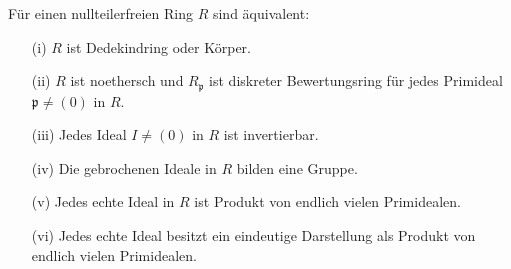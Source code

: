 \begin{Satz}\label{Satz13}
F\"ur einen nullteilerfreien Ring $R$ sind \"aquivalent:

\begin{enumerate}
\item[(i)] $R$ ist Dedekindring oder K\"orper.

\item[(ii)] $R$ ist noethersch und $R_\mathfrak{p}$ ist diskreter Bewertungsring f\"ur jedes Primideal $\mathfrak{p} \neq (0)$ in $R$.

\item[(iii)] Jedes Ideal $I \neq (0)$ in $R$ ist invertierbar.

\item[(iv)] Die gebrochenen Ideale in $R$ bilden eine Gruppe.

\item[(v)] Jedes echte Ideal in $R$ ist Produkt von endlich vielen Primidealen.

\item[(vi)] Jedes echte Ideal besitzt ein eindeutige Darstellung als Produkt von endlich vielen Primidealen.
\end{enumerate}

\end{Satz}

